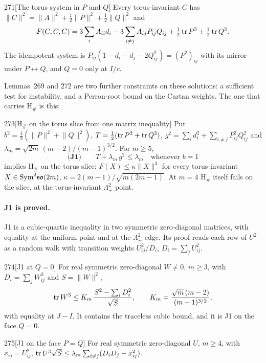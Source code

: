 \begin{Lem}{271}[The torus system in $P$ and $Q$]
Every torus-invariant $C$ has $\lVert C\rVert^2=\lVert A\rVert^2+\tfrac12\lVert P\rVert^2+\tfrac12\lVert Q\rVert^2$ and
\[
F(C,C,C)=3\sum_iA_{ii}d_i-3\sum_{i\ne j}A_{ij}P_{ij}Q_{ij}+\tfrac12\operatorname{tr} P^3+\tfrac12\operatorname{tr} Q^3 .
\]
The idempotent system is $P_{ij}(1-d_i-d_j-2Q_{ij}^2)=(P^2)_{ij}$ with its mirror under $P\leftrightarrow Q$, and $Q=0$ only at $I/c$.
\end{Lem}

Lemmas~269 and 272 are two further constraints on these solutions: a sufficient test for instability, and a Perron-root bound on the Cartan weights. The one that carries H$_\#$ is this:

\begin{Lem}{273}[H$_\#$ on the torus slice from one matrix inequality]
Put $b^2=\tfrac12(\lVert P\rVert^2+\lVert Q\rVert^2)$, $T=\tfrac12(\operatorname{tr} P^3+\operatorname{tr} Q^3)$, $g^2=\sum_id_i^2+\sum_{i\ne j}P_{ij}^2Q_{ij}^2$ and $\lambda_m=\sqrt{2m}\,(m-2)/(m-1)^{3/2}$. For $m\ge5$,
\[
\textbf{(J1)}\qquad T+\lambda_m\,g^2\le\lambda_m\quad\text{whenever }b=1
\]
implies H$_\#$ on the torus slice: $F(X)\le\kappa\lVert X\rVert^3$ for every torus-invariant $X\in\mathrm{Sym}^2\mathfrak{so}(2m)$, $\kappa=2(m-1)/\sqrt{m(2m-1)}$. At $m=4$ H$_\#$ itself fails on the slice, at the torus-invariant $\Lambda^2_+$ point.
\end{Lem}

\paragraph{J1 is proved.} J1 is a cubic-quartic inequality in two symmetric zero-diagonal matrices, with equality at the uniform point and at the $\Lambda^2_+$ edge. Its proof reads each row of $U^2$ as a random walk with transition weights $U_{ij}^2/D_i$, $D_i=\sum_jU_{ij}^2$.

\begin{Lem}{274}[J1 at $Q=0$]
For real symmetric zero-diagonal $W\ne0$, $m\ge3$, with $D_i=\sum_jW_{ij}^2$ and $S=\lVert W\rVert^2$,
\[
\operatorname{tr} W^3\le K_m\,\frac{S^2-\sum_iD_i^2}{\sqrt S},\qquad K_m=\frac{\sqrt m\,(m-2)}{(m-1)^{3/2}},
\]
with equality at $J-I$. It contains the traceless cubic bound, and it is J1 on the face $Q=0$.
\end{Lem}

\begin{Lem}{275}[J1 on the face $P=Q$]
For real symmetric zero-diagonal $U$, $m\ge4$, with $x_{ij}=U_{ij}^2$, $\operatorname{tr} U^3\sqrt S\le\lambda_m\sum_{i\ne j}(D_iD_j-x_{ij}^2)$.
\end{Lem}

